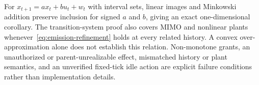 For $x_{t+1}=a x_t+b u_t+w_t$ with interval sets, linear images and Minkowski addition preserve inclusion for signed $a$ and $b$, giving an exact one-dimensional corollary. The transition-system proof also covers MIMO and nonlinear plants whenever~\eqref{eq:emission-refinement} holds at every related history. A convex over-approximation alone does not establish this relation. Non-monotone grants, an unauthorized or parent-unrealizable effect, mismatched history or plant semantics, and an unverified fixed-tick idle action are explicit failure conditions rather than implementation details.
